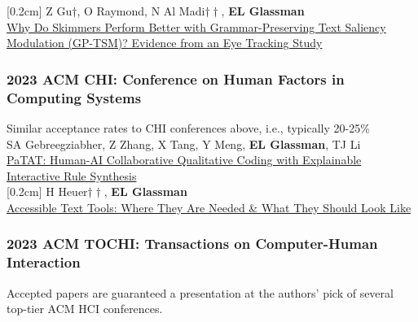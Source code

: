 \documentclass[10pt, a4paper]{article}
\newcommand{\years}[1]{\marginnote{\normalsize #1}}
\begin{document}
[0.2cm]
\years{\textbf{C31} LBW}Z Gu$\dagger$, O Raymond, N Al Madi$\dagger\dagger$, \textbf{EL Glassman}\\
\href{https://glassmanlab.seas.harvard.edu/papers/gptsm_eye_lbw.pdf}{Why Do Skimmers Perform Better with Grammar-Preserving Text Saliency Modulation (GP-TSM)? Evidence from an Eye Tracking Study}

\subsubsection*{2023 ACM \textbf{CHI}: Conference on Human Factors in Computing Systems}
Similar acceptance rates to CHI conferences above, i.e., typically 20-25\%\\[0.2cm]
\years{\textbf{C30}}SA Gebreegziabher, Z Zhang, X Tang, Y Meng, \textbf{EL Glassman}, TJ Li\\ \href{http://glassmanlab.seas.harvard.edu/papers/patat_CHI23.pdf}{PaTAT: Human-AI Collaborative Qualitative Coding with Explainable Interactive Rule Synthesis}\\
[0.2cm]
\years{\textbf{C29} LBW}H Heuer$\dagger\dagger$, \textbf{EL Glassman}\\
\href{https://glassmanlab.seas.harvard.edu/papers/heuer_CHI23LBW_accessibleTextTools.pdf}{Accessible Text Tools: Where They Are Needed \& What They Should Look Like}\\

\subsubsection*{2023 ACM \textbf{TOCHI}: Transactions on Computer-Human Interaction}
Accepted papers are guaranteed a presentation at the authors' pick of several top-tier ACM HCI conferences.\\
\end{document}
